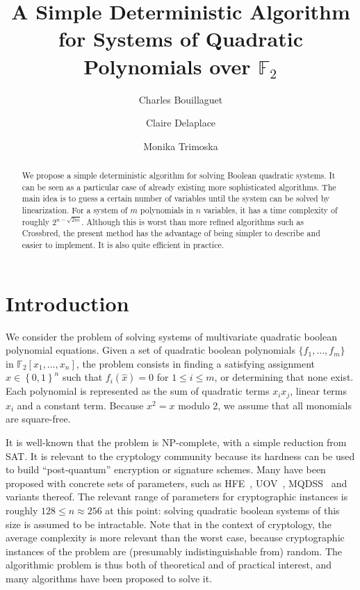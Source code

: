 \documentclass[a4paper,UKenglish,cleveref, autoref]{lipics-v2019}
\title{A Simple Deterministic Algorithm for Systems of Quadratic Polynomials over $\mathbb{F}_2$}
\author{Charles Bouillaguet}{LIP6 laboratory, Sorbonne Université, Paris, France}{charles.bouillaguet@lip6.fr}{https://orcid.org/0000-0001-9416-6244}{}
\author{Claire Delaplace}{MIS Laboratory, Université de Picardie Jules Verne, Amiens, France}{claire.delaplace@u-picardie.fr}{}{}
\author{Monika Trimoska}{MIS Laboratory, Université de Picardie Jules Verne, Amiens, France}{monika.trimoska@u-picardie.fr}{}{}
\newcommand{\bits}{\left\{0, 1\right\}}
\begin{document}
\maketitle

\begin{abstract}
  We propose a simple deterministic algorithm for solving Boolean quadratic systems.
  It can be seen as a particular case of already existing more sophisticated
  algorithms. The main idea is to guess a certain number of variables until the system
  can be solved by linearization. For a system of $m$ polynomials in $n$ variables, it has
  a time complexity of roughly $2^{n-\sqrt{2m}}$. Although this is worst than more refined
  algorithms such as \textsf{Crossbred}, the present method has the advantage of being
  simpler to describe and easier to implement. It is also quite efficient in practice.
\end{abstract}


\clearpage

\section{Introduction}

We consider the problem of solving systems of multivariate quadratic boolean
polynomial equations. Given a set of quadratic boolean polynomials
$\{f_1, \dots, f_m\}$ in $\mathbb{F}_2[x_1, \dots, x_n]$, the problem consists
in finding a satisfying assignment $\hat x \in \bits^n$ such that
$f_i(\hat x) = 0$ for $1 \leq i \leq m$, or determining that none exist. Each
polynomial is represented as the sum of quadratic terms $x_i x_j$, linear terms
$x_i$ and a constant term. Because $x^2 = x$ modulo 2, we assume that all
monomials are square-free.



It is well-known that the problem is NP-complete, with a simple reduction from
SAT. It is relevant to the cryptology community because its hardness can be used
to build ``post-quantum'' encryption or signature schemes. Many have been
proposed with concrete sets of parameters, such as HFE~\cite{Patarin96},
UOV~\cite{KipnisPG99}, MQDSS~\cite{ChenHRSS16} and variants thereof.  The
relevant range of parameters for cryptographic instances is roughly
$128 \leq n \approx 256$ at this point: solving quadratic boolean systems of
this size is assumed to be intractable. Note that in the context of cryptology,
the average complexity is more relevant than the worst case, because
cryptographic instances of the problem are (presumably indistinguishable from)
random. The algorithmic problem is thus both of theoretical and of practical
interest, and many algorithms have been proposed to solve it.
\end{document}
